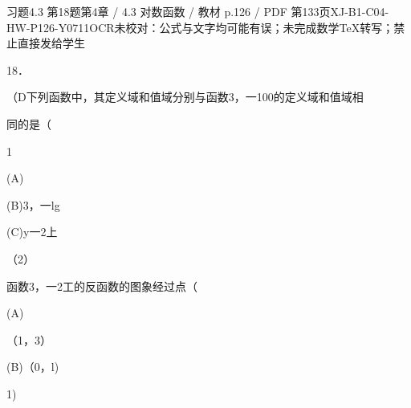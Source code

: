 \begin{bankitem}{习题4.3 第18题}{第4章 / 4.3 对数函数 / 教材 p.126 / PDF 第133页}{XJ-B1-C04-HW-P126-Y0711}{OCR未校对：公式与文字均可能有误；未完成数学TeX转写；禁止直接发给学生}
\begin{ocrdraft}
\par
18．
\par
（D下列函数中，其定义域和值域分别与函数3，一100的定义域和值域相
\par
同的是（
\par
1
\par
(A)
\par
(B)3，一lg
\par
(C)y一2上
\par
（2）
\par
函数3，一2工的反函数的图象经过点（
\par
(A)
\par
（1，3）
\par
(B)（0，l)
\par
1)
\end{ocrdraft}
\end{bankitem}
